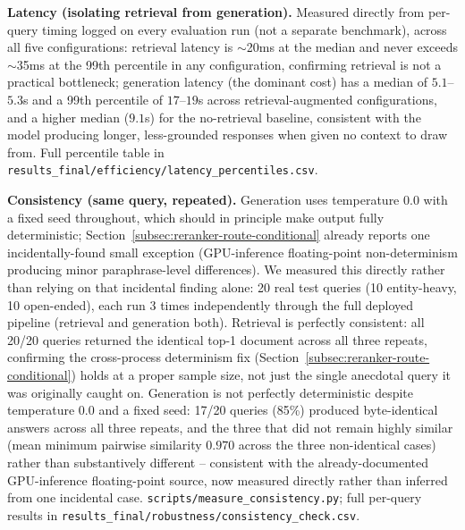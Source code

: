 \documentclass[a4paper,twoside]{article}
\begin{document}
\textbf{Latency (isolating retrieval from generation).} Measured directly from per-query timing logged on every evaluation run (not a separate benchmark), across all five configurations: retrieval latency is $\sim$20ms at the median and never exceeds $\sim$35ms at the 99th percentile in any configuration, confirming retrieval is not a practical bottleneck; generation latency (the dominant cost) has a median of $5.1$--$5.3$s and a 99th percentile of $17$--$19$s across retrieval-augmented configurations, and a higher median ($9.1$s) for the no-retrieval baseline, consistent with the model producing longer, less-grounded responses when given no context to draw from. Full percentile table in \texttt{results\_final/efficiency/latency\_percentiles.csv}.

\textbf{Consistency (same query, repeated).} Generation uses temperature $0.0$ with a fixed seed throughout, which should in principle make output fully deterministic; Section~\ref{subsec:reranker-route-conditional} already reports one incidentally-found small exception (GPU-inference floating-point non-determinism producing minor paraphrase-level differences). We measured this directly rather than relying on that incidental finding alone: 20 real test queries (10 entity-heavy, 10 open-ended), each run 3 times independently through the full deployed pipeline (retrieval and generation both). Retrieval is perfectly consistent: all 20/20 queries returned the identical top-1 document across all three repeats, confirming the cross-process determinism fix (Section~\ref{subsec:reranker-route-conditional}) holds at a proper sample size, not just the single anecdotal query it was originally caught on. Generation is not perfectly deterministic despite temperature $0.0$ and a fixed seed: 17/20 queries (85\%) produced byte-identical answers across all three repeats, and the three that did not remain highly similar (mean minimum pairwise similarity $0.970$ across the three non-identical cases) rather than substantively different -- consistent with the already-documented GPU-inference floating-point source, now measured directly rather than inferred from one incidental case. \texttt{scripts/measure\_consistency.py}; full per-query results in \texttt{results\_final/robustness/consistency\_check.csv}.
\end{document}
